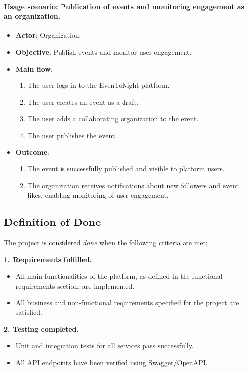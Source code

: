 \paragraph{Usage scenario: Publication of events and monitoring engagement as an organization.}
\begin{itemize}
  \item \textbf{Actor}: Organization.
  \item \textbf{Objective}: Publish events and monitor user engagement.
  \item \textbf{Main flow}:
    \begin{enumerate}
      \item The user logs in to the EvenToNight platform.
      \item The user creates an event as a draft.
      \item The user adds a collaborating organization to the event.
      \item The user publishes the event.
    \end{enumerate}
  \item \textbf{Outcome}:
    \begin{enumerate}
      \item The event is successfully published and visible to platform users.
      \item The organization receives notifications about new followers and event likes, enabling monitoring of user engagement.
    \end{enumerate}
\end{itemize}

\subsection{Definition of Done}

The project is considered \textit{done} when the following criteria are met:

\noindent\textbf{1. Requirements fulfilled.}
\begin{itemize}
  \item All main functionalities of the platform, as defined in the functional requirements section, are implemented.
  \item All business and non-functional requirements specified for the project are satisfied.
\end{itemize}

\noindent\textbf{2. Testing completed.}
\begin{itemize}
  \item Unit and integration tests for all services pass successfully.
  \item All API endpoints have been verified using Swagger/OpenAPI.
\end{itemize}

